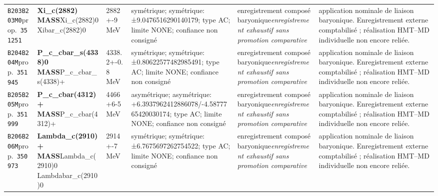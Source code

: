 \begin{landscape}
\begin{longtable}{L{1.85cm}L{4.45cm}L{2.35cm}L{4.05cm}L{3.35cm}L{7.15cm}}
\texttt{B203}\newline \texttt{B203M0}\newline prop.\ \texttt{351251} & \textbf{Xi\_\allowbreak{}c(2882) MASS}\newline Xi\_\allowbreak{}c(2882)0 \textbar{}\allowbreak{} Xibar\_\allowbreak{}c(2882)0 & 2882+-9\,MeV & symétrique; symétrique: ±9.0476516290140179; type AC; limite NONE; confiance non consigné & enregistrement composé baryonique\newline \emph{enregistrement exhaustif sans promotion comparative} & application nominale de liaison baryonique. Enregistrement externe comptabilisé ; réalisation HMT--MD individuelle non encore reliée. \\
\texttt{B204}\newline \texttt{B204M}\newline prop.\ \texttt{351945} & \textbf{P\_\allowbreak{}c\_\allowbreak{}cbar\_\allowbreak{}s(4338)0 MASS}\newline P\_\allowbreak{}c\_\allowbreak{}cbar\_\allowbreak{}s(4338)+ & 4338.2+-0.8\,MeV & symétrique; symétrique: ±0.80622577482985491; type AC; limite NONE; confiance non consigné & enregistrement composé baryonique\newline \emph{enregistrement exhaustif sans promotion comparative} & application nominale de liaison baryonique. Enregistrement externe comptabilisé ; réalisation HMT--MD individuelle non encore reliée. \\
\texttt{B205}\newline \texttt{B205M}\newline prop.\ \texttt{351999} & \textbf{P\_\allowbreak{}c\_\allowbreak{}cbar(4312)+ MASS}\newline P\_\allowbreak{}c\_\allowbreak{}cbar(4312)+ & 4466+6-5\,MeV & asymétrique; asymétrique: +6.3937962412886078/-4.5877765420030174; type AC; limite NONE; confiance non consigné & enregistrement composé baryonique\newline \emph{enregistrement exhaustif sans promotion comparative} & application nominale de liaison baryonique. Enregistrement externe comptabilisé ; réalisation HMT--MD individuelle non encore reliée. \\
\texttt{B206}\newline \texttt{B206M}\newline prop.\ \texttt{350973} & \textbf{Lambda\_\allowbreak{}c(2910)+ MASS}\newline Lambda\_\allowbreak{}c(2910)0 \textbar{}\allowbreak{} Lambdabar\_\allowbreak{}c(2910)0 & 2914+-7\,MeV & symétrique; symétrique: ±6.7675697262754522; type AC; limite NONE; confiance non consigné & enregistrement composé baryonique\newline \emph{enregistrement exhaustif sans promotion comparative} & application nominale de liaison baryonique. Enregistrement externe comptabilisé ; réalisation HMT--MD individuelle non encore reliée. \\

\end{longtable}
\end{landscape}
